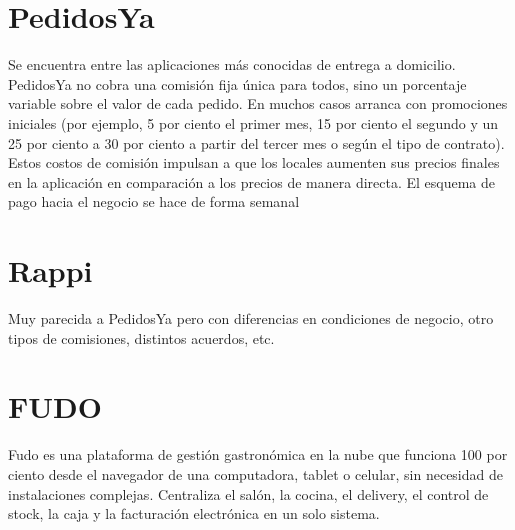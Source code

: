 \documentclass[12pt,a4paper]{report}
\begin{document}
\section{PedidosYa}
\begin{justify}
Se encuentra entre las aplicaciones más conocidas de entrega a domicilio. PedidosYa no cobra una comisión fija única para todos, sino un porcentaje variable sobre el valor de cada pedido. En muchos casos arranca con promociones iniciales (por ejemplo, 5 por ciento el primer mes, 15 por ciento el segundo y un 25 por ciento a 30 por ciento a partir del tercer mes o según el tipo de contrato). Estos costos de comisión impulsan a que los locales aumenten sus precios finales en la aplicación en comparación a los precios de manera directa.
El esquema de pago hacia el negocio se hace de forma semanal
\end{justify}

\section{Rappi}
\begin{justify}
Muy parecida a PedidosYa pero con diferencias en condiciones de negocio, otro tipos de comisiones, distintos acuerdos, etc.
\end{justify}

\section{FUDO}
\begin{justify}
Fudo es una plataforma de gestión gastronómica en la nube que funciona 100 por ciento desde el navegador de una computadora, tablet o celular, sin necesidad de instalaciones complejas. Centraliza el salón, la cocina, el delivery, el control de stock, la caja y la facturación electrónica en un solo sistema.
\end{justify}
\end{document}
